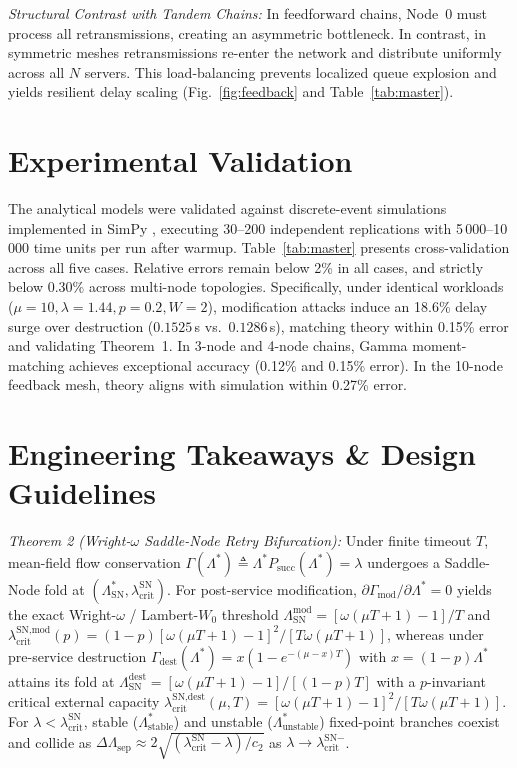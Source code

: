 \documentclass[journal,compsoc]{IEEEtran}
\begin{document}
\textit{Structural Contrast with Tandem Chains:} In feedforward chains, Node~0 must process all retransmissions, creating an asymmetric bottleneck. In contrast, in symmetric meshes retransmissions re-enter the network and distribute uniformly across all $N$ servers. This load-balancing prevents localized queue explosion and yields resilient delay scaling (Fig.~\ref{fig:feedback} and Table~\ref{tab:master}).

\section{Experimental Validation}
The analytical models were validated against discrete-event simulations implemented in SimPy \cite{matloff2008introduction}, executing 30--200 independent replications with 5\,000--10\,000 time units per run after warmup. Table~\ref{tab:master} presents cross-validation across all five cases. Relative errors remain below 2\% in all cases, and strictly below 0.30\% across multi-node topologies. Specifically, under identical workloads ($\mu = 10, \lambda = 1.44, p = 0.2, W = 2$), modification attacks induce an 18.6\% delay surge over destruction ($0.1525$\,s vs.\ $0.1286$\,s), matching theory within 0.15\% error and validating Theorem~1. In 3-node and 4-node chains, Gamma moment-matching achieves exceptional accuracy (0.12\% and 0.15\% error). In the 10-node feedback mesh, theory aligns with simulation within 0.27\% error.

\section{Engineering Takeaways \& Design Guidelines}
\textit{Theorem 2 (Wright-$\omega$ Saddle-Node Retry Bifurcation):} Under finite timeout $T$, mean-field flow conservation $\Gamma(\Lambda^*) \triangleq \Lambda^* P_{\text{succ}}(\Lambda^*) = \lambda$ undergoes a Saddle-Node fold at $(\Lambda_{\text{SN}}^*, \lambda_{\text{crit}}^{\text{SN}})$. For post-service modification, $\partial\Gamma_{\text{mod}}/\partial\Lambda^* = 0$ yields the exact Wright-$\omega$ / Lambert-$W_0$ threshold $\Lambda_{\text{SN}}^{\text{mod}} = [\omega(\mu T + 1) - 1]/T$ and $\lambda_{\text{crit}}^{\text{SN,mod}}(p) = (1-p)[\omega(\mu T + 1) - 1]^2 / [T\omega(\mu T + 1)]$, whereas under pre-service destruction $\Gamma_{\text{dest}}(\Lambda^*) = x(1 - e^{-(\mu-x)T})$ with $x=(1-p)\Lambda^*$ attains its fold at $\Lambda_{\text{SN}}^{\text{dest}} = [\omega(\mu T + 1) - 1]/[(1-p)T]$ with a $p$-invariant critical external capacity $\lambda_{\text{crit}}^{\text{SN,dest}}(\mu, T) = [\omega(\mu T + 1) - 1]^2 / [T\omega(\mu T + 1)]$. For $\lambda < \lambda_{\text{crit}}^{\text{SN}}$, stable ($\Lambda_{\text{stable}}^*$) and unstable ($\Lambda_{\text{unstable}}^*$) fixed-point branches coexist and collide as $\Delta\Lambda_{\text{sep}} \approx 2\sqrt{(\lambda_{\text{crit}}^{\text{SN}} - \lambda)/c_2}$ as $\lambda \to \lambda_{\text{crit}}^{\text{SN}-}$.
\end{document}
